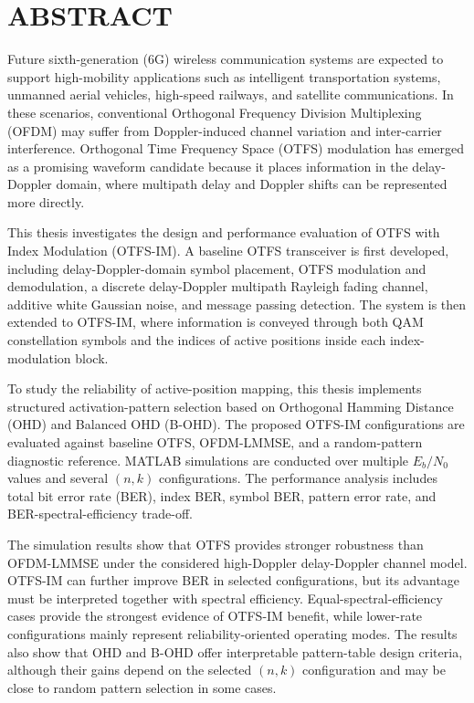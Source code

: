 \section*{ABSTRACT}
\thispagestyle{plain}

Future sixth-generation (6G) wireless communication systems are expected to support high-mobility applications such as intelligent transportation systems, unmanned aerial vehicles, high-speed railways, and satellite communications. In these scenarios, conventional Orthogonal Frequency Division Multiplexing (OFDM) may suffer from Doppler-induced channel variation and inter-carrier interference. Orthogonal Time Frequency Space (OTFS) modulation has emerged as a promising waveform candidate because it places information in the delay-Doppler domain, where multipath delay and Doppler shifts can be represented more directly.

This thesis investigates the design and performance evaluation of OTFS with Index Modulation (OTFS-IM). A baseline OTFS transceiver is first developed, including delay-Doppler-domain symbol placement, OTFS modulation and demodulation, a discrete delay-Doppler multipath Rayleigh fading channel, additive white Gaussian noise, and message passing detection. The system is then extended to OTFS-IM, where information is conveyed through both QAM constellation symbols and the indices of active positions inside each index-modulation block.

To study the reliability of active-position mapping, this thesis implements structured activation-pattern selection based on Orthogonal Hamming Distance (OHD) and Balanced OHD (B-OHD). The proposed OTFS-IM configurations are evaluated against baseline OTFS, OFDM-LMMSE, and a random-pattern diagnostic reference. MATLAB simulations are conducted over multiple \(E_b/N_0\) values and several \((n,k)\) configurations. The performance analysis includes total bit error rate (BER), index BER, symbol BER, pattern error rate, and BER-spectral-efficiency trade-off.

The simulation results show that OTFS provides stronger robustness than OFDM-LMMSE under the considered high-Doppler delay-Doppler channel model. OTFS-IM can further improve BER in selected configurations, but its advantage must be interpreted together with spectral efficiency. Equal-spectral-efficiency cases provide the strongest evidence of OTFS-IM benefit, while lower-rate configurations mainly represent reliability-oriented operating modes. The results also show that OHD and B-OHD offer interpretable pattern-table design criteria, although their gains depend on the selected \((n,k)\) configuration and may be close to random pattern selection in some cases.

